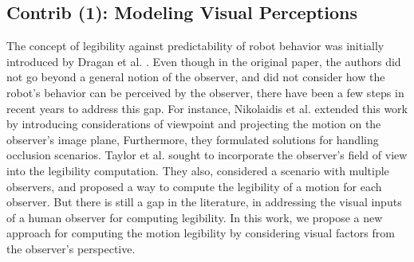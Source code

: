 \documentclass[11pt]{article}
\begin{document}
    \subsection{Contrib (1): Modeling Visual Perceptions}
    The concept of legibility against predictability of robot behavior was initially introduced by Dragan et al. \cite{dragan2013legibility}.
    Even though in the original paper, the authors did not go beyond a general notion of the observer, and did not consider
    how the robot's behavior can be perceived by the observer, there have been a few steps in recent years to address this gap.
    For instance, Nikolaidis et al. \cite{nikolaidis2016based} extended this work by introducing considerations of viewpoint and projecting the motion on the observer's image plane,
    Furthermore, they formulated solutions for handling occlusion scenarios.
    Taylor et al. \cite{taylor2018human} sought to incorporate the observer's field of view into the legibility computation.
    They also, considered a scenario with multiple observers, and proposed a way to compute the legibility of a motion for each observer.
    But there is still a gap in the literature, in addressing the visual inputs of a human observer for computing legibility.
    In this work, we propose a new approach for computing the motion legibility by considering visual factors from the observer's perspective.
\end{document}
